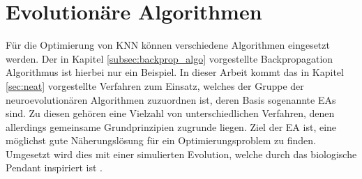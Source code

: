 \section{Evolutionäre Algorithmen}
\label{sec:evolutionary_algos}
Für die Optimierung von \ac{KNN} können verschiedene Algorithmen eingesetzt werden. Der in Kapitel \ref{subsec:backprop_algo} vorgestellte Backpropagation Algorithmus ist hierbei nur ein Beispiel. In dieser Arbeit kommt das in Kapitel \ref{sec:neat} vorgestellte Verfahren zum Einsatz, welches der Gruppe der neuroevolutionären Algorithmen zuzuordnen ist, deren Basis sogenannte \acp{EA} sind. Zu diesen gehören eine Vielzahl von unterschiedlichen Verfahren, denen allerdings gemeinsame Grundprinzipien zugrunde liegen.
Ziel der \ac{EA} ist, eine möglichst gute Näherungslösung für ein Optimierungsproblem zu finden. Umgesetzt wird dies mit einer simulierten Evolution, welche durch das biologische Pendant inspiriert ist \cite{weicker2015evolutionare}.

